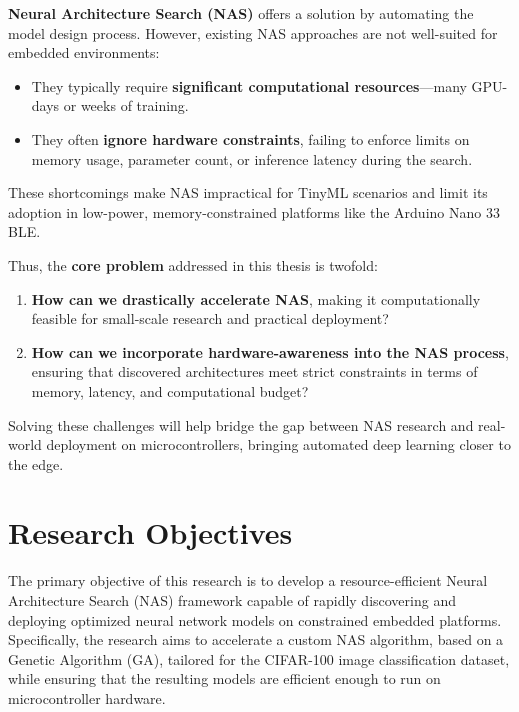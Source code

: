 \textbf{Neural Architecture Search (NAS)} offers a solution by automating the model design process. However, existing NAS approaches are not well-suited for embedded environments:
\begin{itemize}
    \item They typically require \textbf{significant computational resources}—many GPU-days or weeks of training.
    \item They often \textbf{ignore hardware constraints}, failing to enforce limits on memory usage, parameter count, or inference latency during the search.
\end{itemize}

These shortcomings make NAS impractical for TinyML scenarios and limit its adoption in low-power, memory-constrained platforms like the Arduino Nano 33 BLE.

Thus, the \textbf{core problem} addressed in this thesis is twofold:

\begin{enumerate}
    \item \textbf{How can we drastically accelerate NAS}, making it computationally feasible for small-scale research and practical deployment?
    \item \textbf{How can we incorporate hardware-awareness into the NAS process}, ensuring that discovered architectures meet strict constraints in terms of memory, latency, and computational budget?
\end{enumerate}

Solving these challenges will help bridge the gap between NAS research and real-world deployment on microcontrollers, bringing automated deep learning closer to the edge.








\section{Research Objectives}

The primary objective of this research is to develop a resource-efficient Neural Architecture Search (NAS) framework capable of rapidly discovering and deploying optimized neural network models on constrained embedded platforms. Specifically, the research aims to accelerate a custom NAS algorithm, based on a Genetic Algorithm (GA), tailored for the CIFAR-100 image classification dataset, while ensuring that the resulting models are efficient enough to run on microcontroller hardware.

